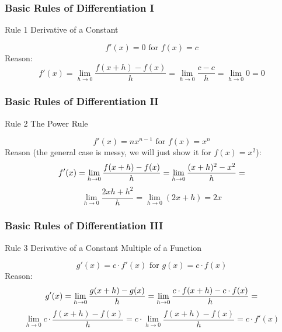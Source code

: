 \documentclass[xcolor=dvipsnames]{beamer}
\begin{document}
\begin{frame}
  \frametitle{Basic Rules of Differentiation I}
  \begin{block}{Rule 1}
Derivative of a Constant
  \end{block}
\begin{equation}
  \label{eq:ligoovah}
f'(x)=0\mbox{ for }f(x)=c
\end{equation}
Reason:
\begin{equation}
  \label{eq:ahnieluz}
f'(x)=\lim_{h\rightarrow{}0}\frac{f(x+h)-f(x)}{h}=\lim_{h\rightarrow{}0}\frac{c-c}{h}=\lim_{h\rightarrow{}0}0=0
\end{equation}
\end{frame}

\begin{frame}
  \frametitle{Basic Rules of Differentiation II}
  \begin{block}{Rule 2}
The Power Rule
  \end{block}
\begin{equation}
  \label{eq:oomaenee}
f'(x)=nx^{n-1}\mbox{ for }f(x)=x^{n}
\end{equation}
Reason (the general case is messy, we will just show it for $f(x)=x^{2}$):
\begin{equation}
  \label{eq:eeyeejeu}
f'(x)=\lim_{h\rightarrow{}0}\frac{f(x+h)-f(x)}{h}=\lim_{h\rightarrow{}0}\frac{(x+h)^{2}-x^{2}}{h}=\notag
\end{equation}
\begin{equation}
  \label{eq:wuuxaise}
\lim_{h\rightarrow{}0}\frac{2xh+h^{2}}{h}=\lim_{h\rightarrow{}0}(2x+h)=2x
\end{equation}
\end{frame}

\begin{frame}
  \frametitle{Basic Rules of Differentiation III}
  \begin{block}{Rule 3}
Derivative of a Constant Multiple of a Function
  \end{block}
\begin{equation}
  \label{eq:thahchae}
g'(x)=c\cdot{}f'(x)\mbox{ for }g(x)=c\cdot{}f(x)
\end{equation}
Reason:
\begin{equation}
  \label{eq:quaipahn}
g'(x)=\lim_{h\rightarrow{}0}\frac{g(x+h)-g(x)}{h}=\lim_{h\rightarrow{}0}\frac{c\cdot{}f(x+h)-c\cdot{}f(x)}{h}=\notag
\end{equation}
\begin{equation}
  \label{eq:mitahrei}
\lim_{h\rightarrow{}0}c\cdot{}\frac{f(x+h)-f(x)}{h}=c\cdot\lim_{h\rightarrow{}0}\frac{f(x+h)-f(x)}{h}=c\cdot{}f'(x)
\end{equation}
\end{frame}
\end{document}
